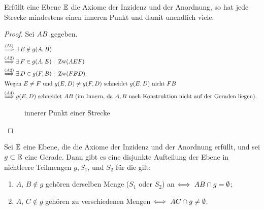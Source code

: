 \begin{thm}
    Erfüllt eine Ebene $\mathbb E$ die Axiome der Inzidenz und der Anordnung, so hat jede Strecke
    mindestens einen inneren Punkt und damit unendlich viele.
\end{thm}

\begin{proof}
    Sei ${AB}$ gegeben.
    \begin{align*}
        \stackrel{(I3)}{\Longrightarrow}\ & \exists\,E\notin g(A,B)\\
        \stackrel{(A2)}{\Longrightarrow}\ & \exists\,F\in g(A,E):\;\operatorname{Zw}(AEF)\\
        \stackrel{(A2)}{\Longrightarrow}\ & \exists\,D\in g(F,B):\;\operatorname{Zw}(FBD).\\
        \intertext{Wegen $E\neq F$ und $g(E,D)\neq g(F,D)$ schneidet $g(E,D)$ nicht ${FB}$}
        \stackrel{(A4)}{\Longrightarrow}\ & g(E,D) \text{ schneidet } {AB} \text{ (im Innern, da
        $A,B$ nach Konstruktion nicht auf der Geraden liegen). }
    \end{align*}

    \begin{figure}[h]
        
        \caption{innerer Punkt einer Strecke}
    \end{figure}
\end{proof}


\begin{thm}\label{thm:satz.s1a}
    Sei $\mathbb E$ eine Ebene, die die Axiome der Inzidenz und der Anordnung erfüllt, und sei $g \subset
    \mathbb E$ eine Gerade. Dann gibt es eine disjunkte Aufteilung der Ebene in nichtleere Teilmengen $g,
    S_1$, und $S_2$ für die gilt:

    \renewcommand{\labelenumi}{\alph{enumi})} %
    \begin{enumerate}
        \item $A,\, B \notin g$ gehören derselben Menge ($S_1$ oder $S_2$) an
            $\Longleftrightarrow\; {AB} \cap g = \emptyset$;

        \item $A,\, C \notin g$ gehören zu verschiedenen Mengen $\Longleftrightarrow\;
            {AC} \cap g \neq \emptyset$.
    \end{enumerate}
\end{thm}

